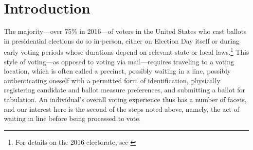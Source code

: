 \documentclass[12pt,titlepage]{article}
\begin{document}
\begin{abstract}
  \noindent 
  Lines can constitute meaningful, albeit unfortunate, aspects of
  individuals' voting experiences. The causes and consequences of
  lines are the subject of ongoing research in the field of election
  administration, and we use early voter check-in times from Florida
  in the General Elections of 2012 and 2016 to study the times at
  which voters cast their ballots and to estimate the effect of
  waiting in line on future turnout.  Our check-in times---involving
  942,194 early in-person voters from 2012 and 1,687,304 from
  2016---highlight the disproportionately problematic experiences
  faced by minority voters, although we find many fewer such problems
  in 2016 compared to 2012.  Moreover, we estimate that Florida early
  in-person voters who waited excessively in 2012 had a very slightly
  lower probability of voting in 2016, \emph{ceteris paribus}.  Our
  results draw attention to the continued importance of voting lines
  and the potential effect they have on future political activity.
\end{abstract}

%

\newpage
\section*{Introduction}

The majority---over 75\% in 2016---of voters in the United States who
cast ballots in presidential elections do so in-person, either on
Election Day itself or during early voting periods whose durations
depend on relevant state or local laws.\footnote{For details on the
  2016 electorate, see \citet{eac:2016}} This style of voting---as
opposed to voting via mail---requires traveling to a voting location,
which is often called a precinct, possibly waiting in a line, possibly
authenticating oneself with a permitted form of identification,
physically registering candidate and ballot measure preferences, and
submitting a ballot for tabulation.  An individual's overall voting
experience thus has a number of facets, and our interest here is the
second of the steps noted above, namely, the act of waiting in line
before being processed to vote.

\end{document}
